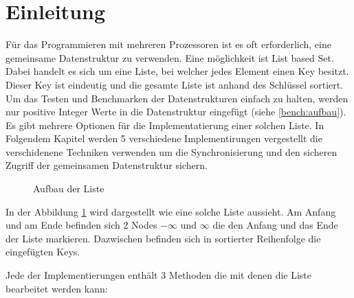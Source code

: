 \documentclass[10pt,a4paper,titlepage,oneside]{article}
\begin{document}
 

\maketitle  
 
\tableofcontents
\newpage  
\section{Einleitung}
Für das Programmieren mit mehreren Prozessoren ist es oft erforderlich, eine gemeinsame Datenstruktur zu verwenden. 
Eine möglichkeit ist List based Set. Dabei handelt es sich um eine Liste, bei welcher jedes Element einen Key besitzt.
Dieser Key ist eindeutig und die gesamte Liste ist anhand des Schlüssel sortiert. 
Um das Testen und Benchmarken der Datenstrukturen einfach zu halten, werden nur positive Integer Werte in die Datenstruktur eingefügt (siehe \ref{bench:aufbau}). Es gibt mehrere Optionen für die Implementatierung einer solchen Liste. In Folgendem Kapitel werden 5 verschiedene Implementirungen vergestellt die verschidenene Techniken verwenden um die Synchronisierung und den sicheren Zugriff der gemeinsamen Datenstruktur sichern.

\begin{figure}[H]
	\centering
	\caption{Aufbau der Liste}
	\label{tik:list}
\end{figure}

In der Abbildung \ref{tik:list} wird dargestellt wie eine solche Liste aussieht. Am Anfang und am Ende befinden sich 2 Nodes $-\infty$ und $\infty$ die den Anfang und das Ende der Liste markieren. Dazwischen befinden sich in sortierter Reihenfolge die eingefügten Keys.

Jede der Implementierungen enthält 3 Methoden die mit denen die Liste bearbeitet werden kann:
\end{document}
